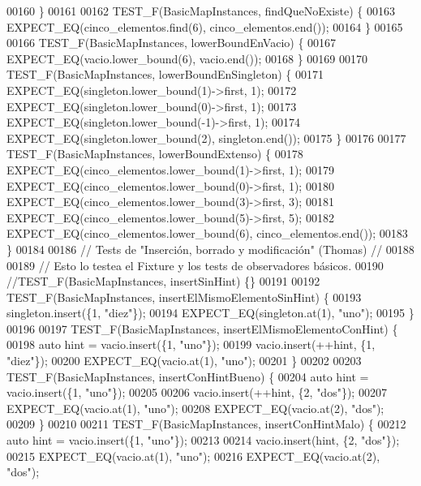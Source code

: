 \begin{DoxyCode}
00160 \}
00161 
00162 TEST\_F(BasicMapInstances, findQueNoExiste) \{
00163     EXPECT\_EQ(cinco\_elementos.find(6), cinco\_elementos.end());
00164 \}
00165 
00166 TEST\_F(BasicMapInstances, lowerBoundEnVacio) \{
00167     EXPECT\_EQ(vacio.lower\_bound(6), vacio.end());
00168 \}
00169 
00170 TEST\_F(BasicMapInstances, lowerBoundEnSingleton) \{
00171     EXPECT\_EQ(singleton.lower\_bound(1)->first, 1);
00172     EXPECT\_EQ(singleton.lower\_bound(0)->first, 1);
00173     EXPECT\_EQ(singleton.lower\_bound(-1)->first, 1);
00174     EXPECT\_EQ(singleton.lower\_bound(2), singleton.end());
00175 \}
00176 
00177 TEST\_F(BasicMapInstances, lowerBoundExtenso) \{
00178     EXPECT\_EQ(cinco\_elementos.lower\_bound(1)->first, 1);
00179     EXPECT\_EQ(cinco\_elementos.lower\_bound(0)->first, 1);
00180     EXPECT\_EQ(cinco\_elementos.lower\_bound(3)->first, 3);
00181     EXPECT\_EQ(cinco\_elementos.lower\_bound(5)->first, 5);
00182     EXPECT\_EQ(cinco\_elementos.lower\_bound(6), cinco\_elementos.end());
00183 \}
00184 
00186 \textcolor{comment}{// Tests de "Inserción, borrado y modificación" (Thomas) //}
00188 \textcolor{comment}{}
00189 \textcolor{comment}{// Esto lo testea el Fixture y los tests de observadores básicos.}
00190 \textcolor{comment}{//TEST\_F(BasicMapInstances, insertSinHint) \{\}}
00191 
00192 TEST\_F(BasicMapInstances, insertElMismoElementoSinHint) \{
00193     singleton.insert(\{1, \textcolor{stringliteral}{"diez"}\});
00194     EXPECT\_EQ(singleton.at(1), \textcolor{stringliteral}{"uno"});
00195 \}
00196 
00197 TEST\_F(BasicMapInstances, insertElMismoElementoConHint) \{
00198     \textcolor{keyword}{auto} hint = vacio.insert(\{1, \textcolor{stringliteral}{"uno"}\});
00199     vacio.insert(++hint, \{1, \textcolor{stringliteral}{"diez"}\});
00200     EXPECT\_EQ(vacio.at(1), \textcolor{stringliteral}{"uno"});
00201 \}
00202 
00203 TEST\_F(BasicMapInstances, insertConHintBueno) \{
00204     \textcolor{keyword}{auto} hint = vacio.insert(\{1, \textcolor{stringliteral}{"uno"}\});
00205 
00206     vacio.insert(++hint, \{2, \textcolor{stringliteral}{"dos"}\});
00207     EXPECT\_EQ(vacio.at(1), \textcolor{stringliteral}{"uno"});
00208     EXPECT\_EQ(vacio.at(2), \textcolor{stringliteral}{"dos"});
00209 \}
00210 
00211 TEST\_F(BasicMapInstances, insertConHintMalo) \{
00212     \textcolor{keyword}{auto} hint = vacio.insert(\{1, \textcolor{stringliteral}{"uno"}\});
00213 
00214     vacio.insert(hint, \{2, \textcolor{stringliteral}{"dos"}\});
00215     EXPECT\_EQ(vacio.at(1), \textcolor{stringliteral}{"uno"});
00216     EXPECT\_EQ(vacio.at(2), \textcolor{stringliteral}{"dos"});

\end{DoxyCode}
